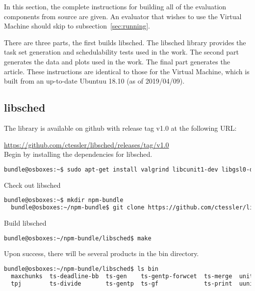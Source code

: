 \documentclass[a4paper]{article}
\begin{document}
In this section, the complete instructions for building all of the
evaluation components from source are given. An evaluator that wishes
to use the Virtual Machine should skip to subsection~\ref{sec:running}.

There are three parts, the first builds libsched. The
libsched library provides the task set generation and schedulability
tests used in the work. The second part generates the data and plots
used in the work. The final part generates the article. These
instructions are identical to those for the Virtual Machine, which is
built from an up-to-date Ubuntuu 18.10 (as of 2019/04/09).

\subsection{libsched}

The library is available on github with release tag v1.0 at the
following URL:

\href{https://github.com/ctessler/libsched/releases/tag/v1.0}{https://github.com/ctessler/libsched/releases/tag/v1.0} \\

{\noindent}Begin by installing the dependencies for libsched.

\begin{lstlisting}[language=bash]
  bundle@osboxes:~$ sudo apt-get install valgrind libcunit1-dev libgsl0-dev
\end{lstlisting}

{\noindent}Check out libsched
\begin{lstlisting}[language=bash]
  bundle@osboxes:~$ mkdir npm-bundle
  bundle@osboxes:~/npm-bundle$ git clone https://github.com/ctessler/libsched.git
\end{lstlisting}

{\noindent}Build libsched
\begin{lstlisting}[language=bash]
  bundle@osboxes:~/npm-bundle/libsched$ make
\end{lstlisting}

{\noindent}Upon success, there will be several products in the bin directory.
\begin{lstlisting}[language=bash]
  bundle@osboxes:~/npm-bundle/libsched$ ls bin
  maxchunks  ts-deadline-bb  ts-gen    ts-gentp-forwcet  ts-merge  unittest
  tpj        ts-divide       ts-gentp  ts-gf             ts-print  uunifast
\end{lstlisting}
\end{document}
